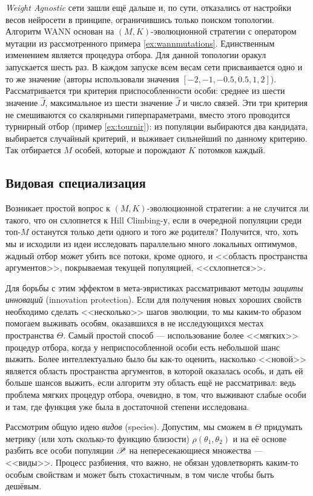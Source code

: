 \emph{Weight Agnostic} сети зашли ещё дальше и, по сути, отказались от настройки весов нейросети в принципе, ограничившись только поиском топологии. Алгоритм WANN основан на $(M, K)$-эволюционной стратегии с оператором мутации из рассмотренного примера \ref{ex:wannmutations}. Единственным изменением является процедура отбора. Для данной топологии оракул запускается шесть раз. В каждом запуске всем весам сети присваивается одно и то же значение (авторы использовали значения $[-2, -1, -0.5, 0.5, 1, 2]$). Рассматривается три критерия приспособленности особи: среднее из шести значение $\hat{J}$, максимальное из шести значение $\hat{J}$ и число связей. Эти три критерия не смешиваются со скалярными гиперпараметрами, вместо этого проводится турнирный отбор (пример \ref{ex:tournir}): из популяции выбираются два кандидата, выбирается случайный критерий, и выживает сильнейший по данному критерию. Так отбирается $M$ особей, которые и порождают $K$ потомков каждый.

\subsection{Видовая специализация}\label{specieisidea}

Возникает простой вопрос к $(M, K)$-эволюционной стратегии: а не случится ли такого, что он схлопнется к Hill Climbing-у, если в очередной популяции среди топ-$M$ останутся только дети одного и того же родителя? Получится, что, хоть мы и исходили из идеи исследовать параллельно много локальных оптимумов, жадный отбор может убить все потоки, кроме одного, и <<область пространства аргументов>>, покрываемая текущей популяцией, <<схлопнется>>.

Для борьбы с этим эффектом в мета-эвристиках рассматривают методы \emph{защиты инноваций} (innovation protection). Если для получения новых хороших свойств необходимо сделать <<несколько>> шагов эволюции, то мы каким-то образом помогаем выживать особям, оказавшихся в не исследующихся местах пространства $\Theta$. Самый простой способ --- использование более <<мягких>> процедур отбора, когда у неприспособленной особи есть небольшой шанс выжить. Более интеллектуально было бы как-то оценить, насколько <<новой>> является область пространства аргументов, в которой оказалась особь, и дать ей больше шансов выжить, если алгоритм эту область ещё не рассматривал: ведь проблема мягких процедур отбора, очевидно, в том, что выживают слабые особи и там, где функция уже была в достаточной степени исследована.

Рассмотрим общую идею \emph{видов} (species). Допустим, мы сможем в $\Theta$ придумать метрику (или хоть сколько-то функцию близости) $\rho(\theta_1, \theta_2)$ и на её основе разбить все особи популяции $\mathscr{P}$ на непересекающиеся множества --- <<виды>>. Процесс разбиения, что важно, не обязан удовлетворять каким-то особым свойствам и может быть стохастичным, в том числе чтобы быть дешёвым. 

